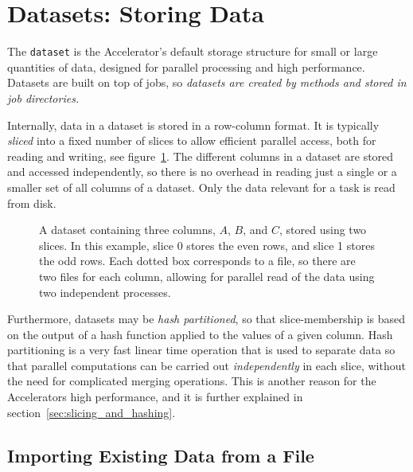 \clearpage

\section{Datasets: Storing Data}

The \texttt{dataset} is the Accelerator's default storage structure
for small or large quantities of data, designed for parallel
processing and high performance.  Datasets are built on top of jobs,
so \emph{datasets are created by methods and stored in job
directories.}

Internally, data in a dataset is stored in a row-column format.  It is
typically \emph{sliced} into a fixed number of slices to allow
efficient parallel access, both for reading and writing, see
figure~\ref{fig:dataset}. The different columns in a dataset are
stored and accessed independently, so there is no overhead in reading
just a single or a smaller set of all columns of a dataset.  Only the
data relevant for a task is read from disk.

\begin{figure}[h!]
  \begin{center}
    \vspace{3ex}
    
    \vspace{1ex}
    \caption{A dataset containing three columns, $A$, $B$, and $C$,
      stored using two slices.  In this example, slice 0 stores the
      even rows, and slice 1 stores the odd rows.  Each dotted box
      corresponds to a file, so there are two files for each column,
      allowing for parallel read of the data using two independent
      processes.}
    \label{fig:dataset}
  \end{center}
\end{figure}

Furthermore, datasets may be \textsl{hash partitioned}, so that
slice-membership is based on the output of a hash function applied to
the values of a given column.  Hash partitioning is a very fast linear
time operation that is used to separate data so that parallel
computations can be carried out \emph{independently} in each slice,
without the need for complicated merging operations.  This is another
reason for the Accelerators high performance, and it is further
explained in section~\ref{sec:slicing_and_hashing}.



\subsection{Importing Existing Data from a File}

